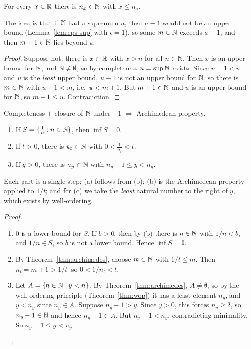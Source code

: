 \begin{nthm}\label{thm:archimedes}
  For every $x \in \mathbb{R}$ there is $n_x \in \mathbb{N}$ with $x \leq n_x$.
\end{nthm}
The idea is that if $\mathbb{N}$ had a supremum $u$, then $u - 1$ would not be an
upper bound (Lemma~\ref{lem:eps-sup} with $\epsilon = 1$), so some $m \in \mathbb{N}$
exceeds $u - 1$, and then $m + 1 \in \mathbb{N}$ lies beyond $u$.

\begin{proof}
  Suppose not: there is $x \in \mathbb{R}$ with $x > n$ for all $n \in \mathbb{N}$. Then $x$
  is an upper bound for $\mathbb{N}$, and $\mathbb{N} \neq \emptyset$, so by completeness
  $u = \sup \mathbb{N}$ exists. Since $u - 1 < u$ and $u$ is the \emph{least} upper
  bound, $u - 1$ is not an upper bound for $\mathbb{N}$, so there is $m \in \mathbb{N}$ with
  $u - 1 < m$, i.e.\ $u < m + 1$. But $m + 1 \in \mathbb{N}$ and $u$ is an upper
  bound for $\mathbb{N}$, so $m + 1 \leq u$. Contradiction.
\end{proof}

\begin{significant}
  Completeness $+$ closure of $\mathbb{N}$ under $+1$ $\Longrightarrow$ Archimedean property.
\end{significant}

\begin{ncor}\label{cor:archimedes}\leavevmode
  \begin{enumerate}[label=(\alph*)]
    \item If $S = \{\frac{1}{n} : n \in \mathbb{N}\}$, then $\inf S = 0$.
    \item If $t > 0$, there is $n_t \in \mathbb{N}$ with $0 < \frac{1}{n_t} < t$.
    \item If $y > 0$, there is $n_y \in \mathbb{N}$ with $n_y - 1 \leq y < n_y$.
  \end{enumerate}
\end{ncor}
Each part is a single step: (a) follows from (b); (b) is the Archimedean
property applied to $1/t$; and for (c) we take the \emph{least} natural
number to the right of $y$, which exists by well-ordering.

\begin{proof}\leavevmode
  \begin{enumerate}[label=(\alph*)]
    \item $0$ is a lower bound for $S$. If $b > 0$, then by (b) there is
      $n \in \mathbb{N}$ with $1/n < b$, and $1/n \in S$, so $b$ is not a lower bound.
      Hence $\inf S = 0$.
    \item By Theorem~\ref{thm:archimedes}, choose $m \in \mathbb{N}$ with
      $1/t \leq m$. Then $n_t = m + 1 > 1/t$, so $0 < 1/n_t < t$.
    \item Let $A = \{n \in \mathbb{N} : y < n\}$. By Theorem~\ref{thm:archimedes},
      $A \neq \emptyset$, so by the well-ordering principle
      (Theorem~\ref{thm:wop}) it has a least element $n_y$, and $y < n_y$
      since $n_y \in A$. Suppose $n_y - 1 > y$. Since $y > 0$, this forces
      $n_y \geq 2$, so $n_y - 1 \in \mathbb{N}$ and hence $n_y - 1 \in A$. But
      $n_y - 1 < n_y$, contradicting minimality. So
      $n_y - 1 \leq y < n_y$.\qedhere
  \end{enumerate}
\end{proof}


